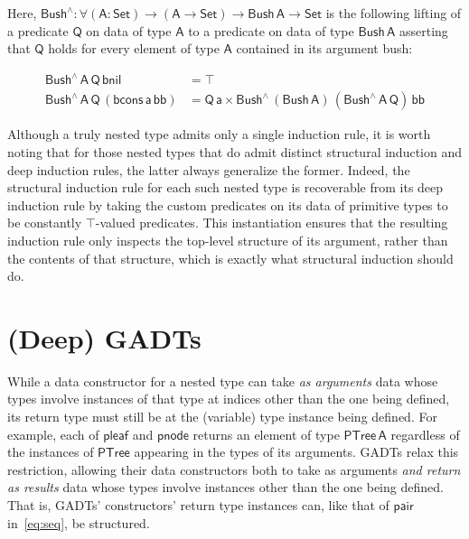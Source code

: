 \documentclass[9pt]{entcs}
\begin{document}
\vspace*{-0.05in}

\noindent
Here, $\mathsf{Bush^{\wedge} : \forall (A : Set) \to (A \to Set) \to
  Bush\,A \to Set}$ is the following lifting of a predicate
$\mathsf{Q}$ on data of type $\mathsf{A}$ to a predicate on data of
type $\mathsf{Bush\,A}$ asserting that $\mathsf{Q}$ holds for every
element of type $\mathsf{A}$ contained in its argument bush:

\vspace*{-0.15in}

\begin{align*}
\mathsf{Bush^{\wedge}\,A\,Q\,bnil} &= \mathsf{\top} \\
\mathsf{Bush^{\wedge}\,A\,Q\,(bcons\,a\,bb)} &= \mathsf{Q\,a \times
  Bush^{\wedge}\,(Bush\,A)\,(Bush^{\wedge}\,A\,Q)\,bb}
\end{align*}

\vspace*{-0.05in}

Although a truly nested type admits only a single induction rule, it
is worth noting that for those nested types that do admit distinct
structural induction and deep induction rules, the latter always
generalize the former. Indeed, the structural induction rule for each
such nested type is recoverable from its deep induction rule by taking
the custom predicates on its data of primitive types to be constantly
$\mathsf{\top}$-valued predicates. This instantiation ensures that the
resulting induction rule only inspects the top-level structure of its
argument, rather than the contents of that structure, which is exactly
what structural induction should do.

\section{(Deep) GADTs}\label{sec:GADTs}

While a data constructor for a nested type can take {\em as arguments}
data whose types involve instances of that type at indices other than
the one being defined, its return type must still be at the (variable)
type instance being defined. For example, each of $\mathsf{pleaf}$ and
$\mathsf{pnode}$ returns an element of type $\mathsf{PTree\,A}$
regardless of the instances of $\mathsf{PTree}$ appearing in the types
of its arguments. GADTs relax this restriction, allowing their data
constructors both to take as arguments \emph{and return as results}
data whose types involve instances other than the one being
defined. That is, GADTs' constructors' return type instances can, like
that of $\mathsf{pair}$ in~\eqref{eq:seq}, be structured.
%
\end{document}
